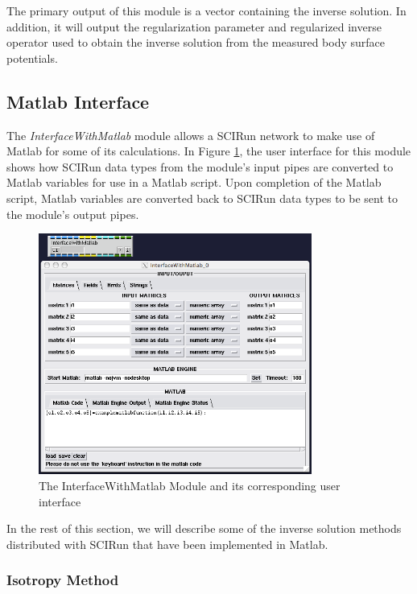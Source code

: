 The primary output of this module is a vector containing the inverse solution. In addition, it will output the regularization parameter and regularized inverse operator used to obtain the inverse solution from the measured body surface potentials.


\subsection{Matlab Interface}

The \textit{InterfaceWithMatlab} module allows a SCIRun network to make use of Matlab for some of its calculations. In Figure \ref{matlabinterfacemodule}, the user interface for this module shows how SCIRun data types from the module's input pipes are converted to Matlab variables for use in a Matlab script. Upon completion of the Matlab script, Matlab variables are converted back to SCIRun data types to be sent to the module's output pipes.

\begin{figure}[H]
\begin{center}
\includegraphics[width=0.8\textwidth]{ECGToolkitGuide_figures/InterfaceWithMatlab.png}
\caption{The InterfaceWithMatlab Module and its corresponding user interface}
\label{matlabinterfacemodule}
\end{center}
\end{figure}

In the rest of this section, we will describe some of the inverse solution methods distributed with SCIRun that have been implemented in Matlab.


\subsubsection{Isotropy Method}

